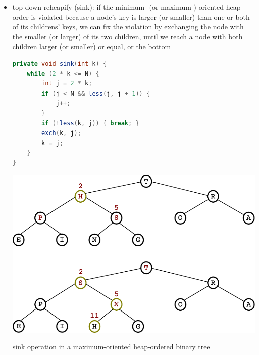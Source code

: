 \documentclass[8pt,a4paper,compress]{beamer}
\begin{document}
\begin{frame}[fragile]
\begin{itemize}
\item top-down reheapify (sink): if the minimum- (or maximum-) oriented heap order is violated because a node's key is larger (or smaller) than one or both of its childrens' keys, we can fix the violation by exchanging the node with the smaller (or larger) of its two children, until we reach a node with both children
larger (or smaller) or equal, or the bottom 

\bigskip

\begin{minipage}{150pt}
\begin{lstlisting}[language=Java]
private void sink(int k) {
    while (2 * k <= N) {
        int j = 2 * k;
        if (j < N && less(j, j + 1)) { 
            j++; 
        }
        if (!less(k, j)) { break; }
        exch(k, j);
        k = j;
    }
}
\end{lstlisting}
\end{minipage}%
\begin{minipage}{130pt}
\hfill \includegraphics[scale=0.35]{./figures/heapify_sink.pdf}
\end{minipage}

\smallskip

\begin{center}
sink operation in a maximum-oriented heap-ordered binary tree
\end{center}
\end{itemize}
\end{frame}
\end{document}
